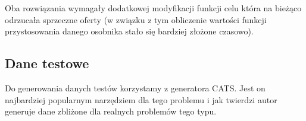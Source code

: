 Oba rozwiązania wymagały dodatkowej modyfikacji funkcji celu która na bieżąco odrzucała sprzeczne oferty (w związku z tym obliczenie wartości funkcji przystosowania danego osobnika stało się bardziej złożone czasowo).

\subsection{Dane testowe}
    Do generowania danych testów korzystamy z generatora CATS. Jest on najbardziej popularnym narzędziem dla tego problemu i jak twierdzi autor generuje dane zbliżone dla realnych problemów tego typu.






